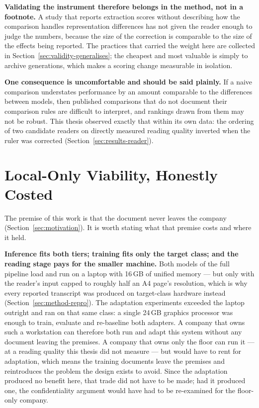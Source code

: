 \textbf{Validating the instrument therefore belongs in the method, not in a footnote.} A study
that reports extraction scores without describing how the comparison handles representation
differences has not given the reader enough to judge the numbers, because the size of the
correction is comparable to the size of the effects being reported. The practices that carried
the weight here are collected in Section~\ref{sec:validity-generalises}; the cheapest and most
valuable is simply to archive generations, which makes a scoring change measurable in isolation.

\textbf{One consequence is uncomfortable and should be said plainly.} If a naive comparison
understates performance by an amount comparable to the differences between models, then
published comparisons that do not document their comparison rules are difficult to interpret,
and rankings drawn from them may not be robust. This thesis observed exactly that within its own
data: the ordering of two candidate readers on directly measured reading quality inverted when
the ruler was corrected (Section~\ref{sec:results-reader}).

\section{Local-Only Viability, Honestly Costed}
\label{sec:disc-local}

The premise of this work is that the document never leaves the company
(Section~\ref{sec:motivation}). It is worth stating what that premise costs and where it held.

\textbf{Inference fits both tiers; training fits only the target class; and the reading stage
pays for the smaller machine.} Both models
of the full pipeline load and run on a laptop with 16\,\ac{GB} of unified memory --- but only
with the reader's input capped to roughly half an A4 page's resolution, which is why every
reported transcript was produced on target-class hardware instead (Section~\ref{sec:method-repro}).
The adaptation experiments exceeded the laptop outright and ran on that same class: a single
24\,\ac{GB} graphics processor was enough to train, evaluate and re-baseline both adapters. A
company that owns such a workstation can therefore both run and adapt this system without any
document leaving the premises. A company that owns only the floor can run it --- at a reading
quality this thesis did not measure --- but would have to rent for adaptation, which means the
training documents leave the premises and reintroduces the problem the design exists to
avoid. Since the adaptation produced no benefit here, that trade did not have to be made; had
it produced one, the confidentiality argument would have had to be re-examined for the
floor-only company.

